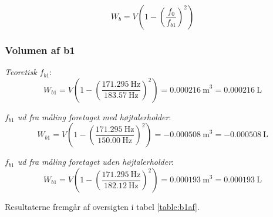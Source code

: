 {\begin{equation}
		W_{b} = V\left(1-\left(\frac{f_{0}}{f_{b1}}\right)^2\right)
\end{equation}
 

\subsubsection{Volumen af b1}

\textit{Teoretisk $f_{b1}$}:
\begin{equation}
		W_{b1} = V\left(1-\left(\frac{{\SI{171,295}{\hertz}}
}{{\SI{183,57}{\hertz}}}\right)^2\right) = {\SI{0,000216}{\meter}^3} = {\SI{0,000216}{\liter}}
\end{equation}

\textit{$f_{b1}$ ud fra måling foretaget med højtalerholder}: 
\begin{equation}
		W_{b1} = V\left(1-\left(\frac{{\SI{171,295}{\hertz}}
}{{\SI{150,00}{\hertz}}}\right)^2\right) = {\SI{-0,000508}{\meter}^3} = {\SI{-0,000508}{\liter}}
\end{equation}

\textit{$f_{b1}$ ud fra måling foretaget uden højtalerholder}: 
\begin{equation}
		W_{b1} = V\left(1-\left(\frac{{\SI{171,295}{\hertz}}
}{{\SI{182,12}{\hertz}}}\right)^2\right) = {\SI{0,000193}{\meter}^3} = {\SI{0,000193}{\liter}}
\end{equation}

\hspace{1,5cm}
Resultaterne fremgår af oversigten i tabel \ref{table:b1af}.\\ 

}
